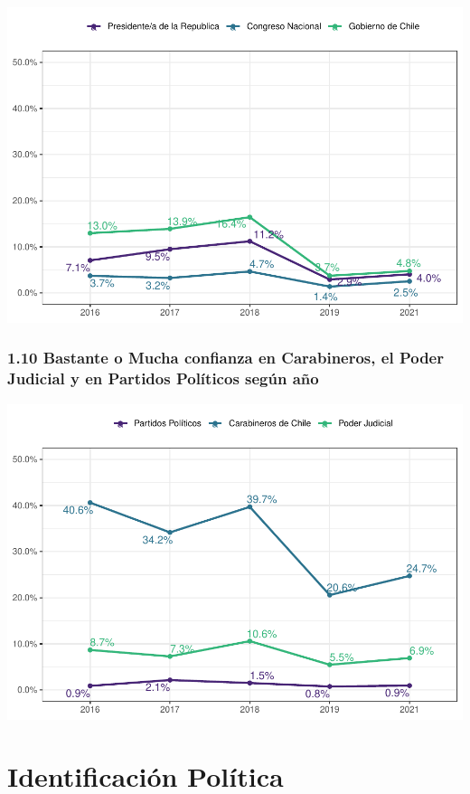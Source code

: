 \documentclass[
  12pt,
]{book}
\begin{document}
\includegraphics{reporte-elsoc_files/figure-latex/unnamed-chunk-14-1.pdf}

\hypertarget{bastante-o-mucha-confianza-en-carabineros-el-poder-judicial-y-en-partidos-poluxedticos-seguxfan-auxf1o}{%
\subsection{1.10 Bastante o Mucha confianza en Carabineros, el Poder Judicial y en Partidos Políticos según año}\label{bastante-o-mucha-confianza-en-carabineros-el-poder-judicial-y-en-partidos-poluxedticos-seguxfan-auxf1o}}

\includegraphics{reporte-elsoc_files/figure-latex/unnamed-chunk-15-1.pdf}

\hypertarget{identificaciuxf3n-poluxedtica}{%
\chapter{Identificación Política}\label{identificaciuxf3n-poluxedtica}}
\end{document}
